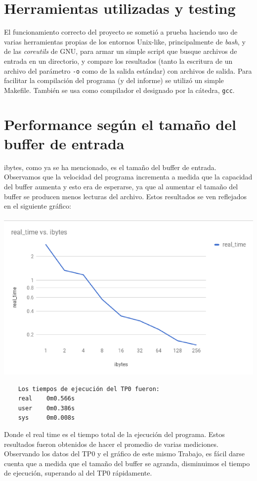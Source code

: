 \documentclass[a4paper,10pt]{article}
\begin{document}
    \section{Herramientas utilizadas y testing}
El funcionamiento correcto del proyecto se sometió a prueba haciendo uso de varias herramientas propias de los entornos Unix-like, principalmente de \textit{bash}, y de las \textit{coreutils} de GNU, para armar un simple script que busque archivos de entrada en un directorio, y compare los resultados (tanto la escritura de un archivo del parámetro \texttt{-o} como de la salida estándar) con archivos de salida. Para facilitar la compilación del programa (y del informe) se utilizó un simple Makefile. También se usa como compilador el designado por la cátedra, \texttt{gcc}.
\newpage
    \section{Performance según el tamaño del buffer de entrada}
    ibytes, como ya se ha mencionado, es el tamaño del buffer de entrada. Observamos que la velocidad del programa incrementa a medida que la capacidad del buffer aumenta y esto era de esperarse, ya que al aumentar el tamaño del buffer se producen menos lecturas del archivo. Estos resultados se ven reflejados en el siguiente gráfico:\\\\
    \includegraphics[width=14cm]{plots/times.png}\\
    
    \begin{Verbatim}
    Los tiempos de ejecución del TP0 fueron:
    real    0m0.566s
    user    0m0.386s
    sys     0m0.008s
    \end{Verbatim}
    Donde el real time es el tiempo total de la ejecución del programa. Estos resultados fueron obtenidos de hacer el promedio de varias mediciones.\\
    Observando los datos del TP0 y el gráfico de este mismo Trabajo, es fácil darse cuenta que a medida que el tamaño del buffer se agranda, disminuimos el tiempo de ejecución, superando al del TP0 rápidamente.
    
\end{document}
